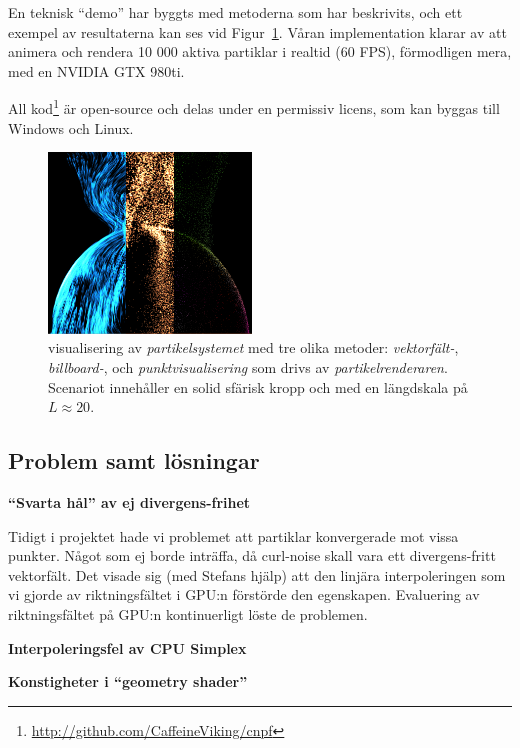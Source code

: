 \documentclass[a4paper]{article}
\begin{document}
\begin{multicols}{2}
En teknisk ``demo'' har byggts med metoderna som har beskrivits, och ett exempel av resultaterna kan ses vid Figur~\ref{fig:verysexy}. Våran implementation klarar av att animera och rendera 10 000 aktiva partiklar i realtid (60 FPS), förmodligen mera, med en NVIDIA GTX 980ti.

All kod\footnote{\url{http://github.com/CaffeineViking/cnpf}} är open-source och delas under en permissiv licens, som kan byggas till Windows och Linux.

\begin{figure}[H]
\center
\includegraphics[width=0.48\textwidth]{share/merged_shaders.png}
    \caption{visualisering av \emph{partikelsystemet} med tre olika metoder: \emph{vektorfält-}, \emph{billboard-}, och \emph{punktvisualisering} som drivs av \emph{partikelrenderaren}. Scenariot innehåller en solid sfärisk kropp och med en längdskala på \(L\approx20\).}
\label{fig:verysexy}
\end{figure}

        \subsection{Problem samt lösningar}

            \textbf{``Svarta hål'' av ej divergens-frihet}

            Tidigt i projektet hade vi problemet att partiklar konvergerade mot vissa punkter. Något som ej borde inträffa, då curl-noise skall vara ett divergens-fritt vektorfält. Det visade sig (med Stefans hjälp) att den linjära interpoleringen som vi gjorde av riktningsfältet i GPU:n förstörde den egenskapen. Evaluering av riktningsfältet på GPU:n kontinuerligt löste de problemen.

            \textbf{Interpoleringsfel av CPU Simplex}


            \textbf{Konstigheter i ``geometry shader''}
            

\end{multicols}
\end{document}
